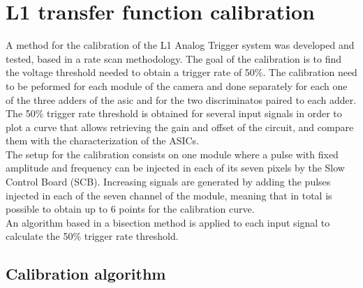 \documentclass[a4paper,10pt]{book}
\begin{document}
\section{L1 transfer function calibration}

A method for the calibration of the L1 Analog Trigger system was developed and tested, based in a rate scan methodology. The goal of the calibration is to find the voltage threshold needed to 
obtain a trigger rate of 50\%. The calibration need to be peformed for each module of the camera and done separately for each one of the three adders of the asic and for the two discriminatos
paired to each adder. The 50\% trigger rate threshold is obtained for several input signals in order to plot a curve that allows retrieving the gain and offset of the circuit, and compare them
with the characterization of the ASICs. \\
The setup for the calibration consists on one module where a pulse with fixed amplitude and frequency can be injected in each of its seven pixels by the Slow Control Board (SCB). Increasing 
signals are generated by adding the pulses injected in each of the seven channel of the module, meaning that in total is possible to obtain up to 6 points for the calibration curve. \\
An algorithm based in a bisection method is applied to each input signal to calculate the 50\% trigger rate threshold.

\subsection{Calibration algorithm}
\end{document}

